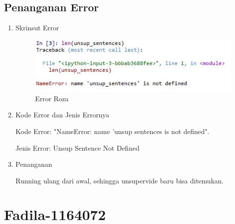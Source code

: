 \begin{enumerate}
\subsection{Penanganan Error}
\begin{enumerate}
\item Skrinsut Error
\begin{figure}[ht]
\centering
\includegraphics[scale=0.5]{figures/errorrozaaa.jpg}
\caption{ Error Roza}
\label{6}
\end{figure}
\item Kode Error dan Jenis Errornya
\par Kode Error: "NameError: name 'unsup sentences is not defined". 
\par Jenis Error: Unsup Sentence Not Defined
\item Penanganan
\par Running ulang dari awal, sehingga unsupervide baru bisa ditemukan.

\end{enumerate}


\par
\par
\par
\par
\par
\section{Fadila-1164072}

\end{enumerate}
